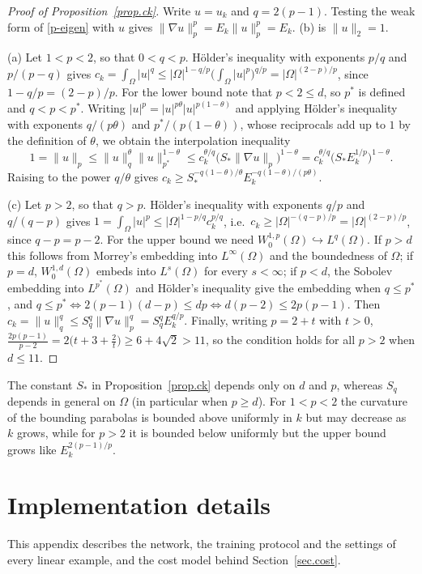 \documentclass[10pt]{amsart}
\theoremstyle{definition}
\theoremstyle{remark}
\theoremstyle{plain}
\begin{document}
\begin{proof}[Proof of Proposition~\ref{prop.ck}]
Write $u=u_k$ and $q=2(p-1)$. Testing the weak form of \eqref{p-eigen} with $u$ gives
$\|\nabla u\|_p^p=E_k\|u\|_p^p=E_k$. (b) is $\|u\|_2=1$.

(a) Let $1<p<2$, so that $0<q<p$. H\"older's inequality with exponents $p/q$ and $p/(p-q)$ gives
$c_k=\int_\Omega|u|^q\le|\Omega|^{1-q/p}\big(\int_\Omega|u|^p\big)^{q/p}=|\Omega|^{(2-p)/p}$, since
$1-q/p=(2-p)/p$. For the lower bound note that $p<2\le d$, so $p^*$ is defined and $q<p<p^*$. Writing
$|u|^p=|u|^{p\theta}|u|^{p(1-\theta)}$ and applying H\"older's inequality with exponents
$q/(p\theta)$ and $p^*/(p(1-\theta))$, whose reciprocals add up to $1$ by the definition of $\theta$, we
obtain the interpolation inequality
\[
1=\|u\|_p\le\|u\|_q^{\theta}\|u\|_{p^*}^{1-\theta}\le c_k^{\theta/q}\big(S_*\|\nabla u\|_p\big)^{1-\theta}
=c_k^{\theta/q}\big(S_*E_k^{1/p}\big)^{1-\theta}.
\]
Raising to the power $q/\theta$ gives $c_k\ge S_*^{-q(1-\theta)/\theta}E_k^{-q(1-\theta)/(p\theta)}$.

(c) Let $p>2$, so that $q>p$. H\"older's inequality with exponents $q/p$ and $q/(q-p)$ gives
$1=\int_\Omega|u|^p\le|\Omega|^{1-p/q}c_k^{p/q}$, i.e.\ $c_k\ge|\Omega|^{-(q-p)/p}=|\Omega|^{(2-p)/p}$, since
$q-p=p-2$. For the upper bound we need $W^{1,p}_0(\Omega)\hookrightarrow L^q(\Omega)$. If $p>d$ this follows
from Morrey's embedding into $L^\infty(\Omega)$ and the boundedness of $\Omega$; if $p=d$,
$W^{1,d}_0(\Omega)$ embeds into $L^s(\Omega)$ for every $s<\infty$; if $p<d$, the Sobolev embedding into
$L^{p^*}(\Omega)$ and H\"older's inequality give the embedding when $q\le p^*$, and
$q\le p^*\iff2(p-1)(d-p)\le dp\iff d(p-2)\le2p(p-1)$. Then
$c_k=\|u\|_q^q\le S_q^q\|\nabla u\|_p^q=S_q^qE_k^{q/p}$. Finally, writing $p=2+t$ with $t>0$,
$\frac{2p(p-1)}{p-2}=2\big(t+3+\frac2t\big)\ge6+4\sqrt2>11$, so the condition holds for all $p>2$ when
$d\le11$.
\end{proof}

The constant $S_*$ in Proposition~\ref{prop.ck} depends only on $d$ and $p$, whereas $S_q$ depends in
general on $\Omega$ (in particular when $p\ge d$). For $1<p<2$ the curvature of the bounding parabolas
is bounded above uniformly in $k$ but may decrease as $k$ grows, while for $p>2$ it is bounded below
uniformly but the upper bound grows like $E_k^{2(p-1)/p}$.

\section{Implementation details}\label{sec.implementation}
This appendix describes the network, the training protocol and the settings of every linear example, and the cost model behind Section~\ref{sec.cost}.
\end{document}
